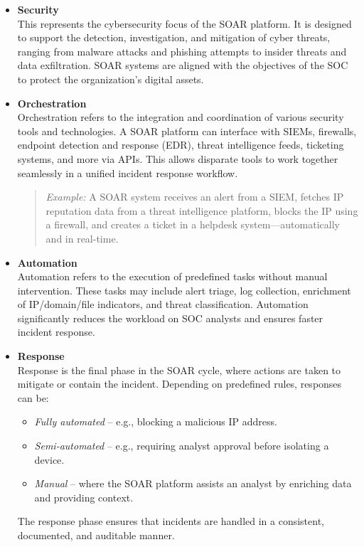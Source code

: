 \begin{itemize}
    \item \textbf{Security} \\
    This represents the cybersecurity focus of the SOAR platform. It is designed to support the detection, investigation, and mitigation of cyber threats, ranging from malware attacks and phishing attempts to insider threats and data exfiltration. SOAR systems are aligned with the objectives of the SOC to protect the organization’s digital assets.

    \item \textbf{Orchestration} \\
    Orchestration refers to the integration and coordination of various security tools and technologies. A SOAR platform can interface with SIEMs, firewalls, endpoint detection and response (EDR), threat intelligence feeds, ticketing systems, and more via APIs. This allows disparate tools to work together seamlessly in a unified incident response workflow.

    \begin{quote}
        \textit{Example:} A SOAR system receives an alert from a SIEM, fetches IP reputation data from a threat intelligence platform, blocks the IP using a firewall, and creates a ticket in a helpdesk system—automatically and in real-time.
    \end{quote}

    \item \textbf{Automation} \\
    Automation refers to the execution of predefined tasks without manual intervention. These tasks may include alert triage, log collection, enrichment of IP/domain/file indicators, and threat classification. Automation significantly reduces the workload on SOC analysts and ensures faster incident response.

    \item \textbf{Response} \\
    Response is the final phase in the SOAR cycle, where actions are taken to mitigate or contain the incident. Depending on predefined rules, responses can be:
    \begin{itemize}
        \item \textit{Fully automated} – e.g., blocking a malicious IP address.
        \item \textit{Semi-automated} – e.g., requiring analyst approval before isolating a device.
        \item \textit{Manual} – where the SOAR platform assists an analyst by enriching data and providing context.
    \end{itemize}
    The response phase ensures that incidents are handled in a consistent, documented, and auditable manner.
\end{itemize}

